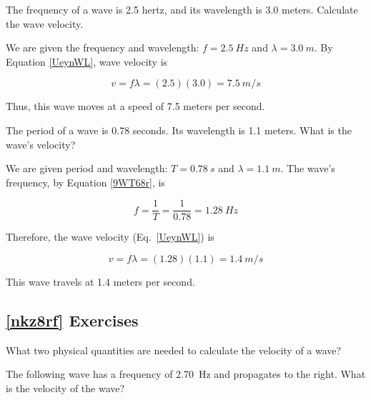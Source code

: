 \documentclass{article}
\numberwithin{equation}{section}
\numberwithin{figure}{section}
\begin{document}

\begin{example}
The frequency of a wave is 2.5 hertz, and its wavelength is 3.0 meters. Calculate the wave velocity.
\end{example}

\Solution We are given the frequency and wavelength: $f = \SI{2.5}{Hz}$ and $\lambda = \SI{3.0}{m}$. By Equation \eqref{UeynWL}, wave velocity is

\begin{equation*}
    v = f \lambda = (2.5)(3.0) = \SI{7.5}{m/s}
\end{equation*}

Thus, this wave moves at a speed of 7.5 meters per second.

\solutionEnd

\begin{example}
    The period of a wave is 0.78 seconds. Its wavelength is 1.1 meters. What is the wave's velocity?
\end{example}

\Solution We are given period and wavelength: $T = \SI{0.78}{s}$ and $\lambda = \SI{1.1}{m}$. The wave's frequency, by Equation \eqref{9WT68r}, is

\begin{equation*}
    f = \frac{1}{T} = \frac{1}{0.78} = \SI{1.28}{Hz}
\end{equation*}


Therefore, the wave velocity (Eq.~\ref{UeynWL}) is

\begin{equation*}
    v = f \lambda = (1.28)(1.1) = \SI{1.4}{m/s}
\end{equation*}

This wave travels at 1.4 meters per second.

\solutionEnd

\subsection*{\ref{nkz8rf} Exercises}

\begin{exercise}
    What two physical quantities are needed to calculate the velocity of a wave?
\end{exercise}

\begin{exercise} \label{SKv3ek}
    The following wave has a frequency of \SI{2.70}{Hz} and propagates to the right. What is the velocity of the wave?
\end{exercise}
\end{document}
